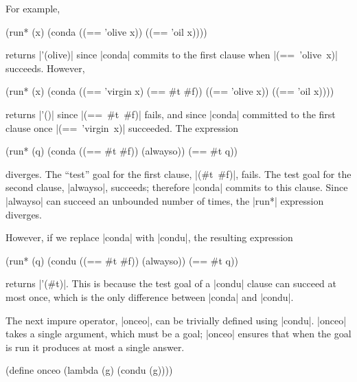 For example,

\schemedisplayspace
\begin{schemedisplay}
(run* (x)
  (conda
    ((== 'olive x))
    ((== 'oil x))))
\end{schemedisplay}

\noindent returns \scheme|'(olive)| since \scheme|conda| commits to
the first clause when \mbox{\scheme|(== 'olive x)|} succeeds.
However,

\schemedisplayspace
\begin{schemedisplay}
(run* (x)
  (conda
    ((== 'virgin x) (== #t #f))
    ((== 'olive x))
    ((== 'oil x))))
\end{schemedisplay}

\noindent returns \scheme|'()| since \mbox{\scheme|(== #t #f)|} fails,
and since \scheme|conda| committed to the first clause once
\mbox{\scheme|(== 'virgin x)|} succeeded.
The expression

\schemedisplayspace
\begin{schemedisplay}
(run* (q)
  (conda
    ((== #t #f))
    (alwayso))
  (== #t q))
\end{schemedisplay}

\noindent diverges.  The ``test'' goal for the first clause,
\mbox{\scheme|(#t #f)|}, fails.  The test goal for the second clause,
\scheme|alwayso|, succeeds; therefore \scheme|conda| commits to this
clause.  Since \scheme|alwayso| can succeed an unbounded number of
times, the \scheme|run*| expression diverges.

However, if we replace \scheme|conda| with \scheme|condu|, the
resulting expression

\schemedisplayspace
\begin{schemedisplay}
(run* (q)
  (condu
    ((== #t #f))
    (alwayso))
  (== #t q))
\end{schemedisplay}

\noindent returns \scheme|'(#t)|.  This is because the test goal of a
\scheme|condu| clause can succeed at most once, which is the only
difference between \scheme|conda| and \scheme|condu|.

The next impure operator, \scheme|onceo|, can be trivially defined
using \scheme|condu|.  \scheme|onceo| takes a single argument, which
must be a goal; \scheme|onceo| ensures that when the goal is run it
produces at most a single answer.

\schemedisplayspace
\begin{schemedisplay}
(define onceo
  (lambda (g)
    (condu
      (g))))
\end{schemedisplay}

